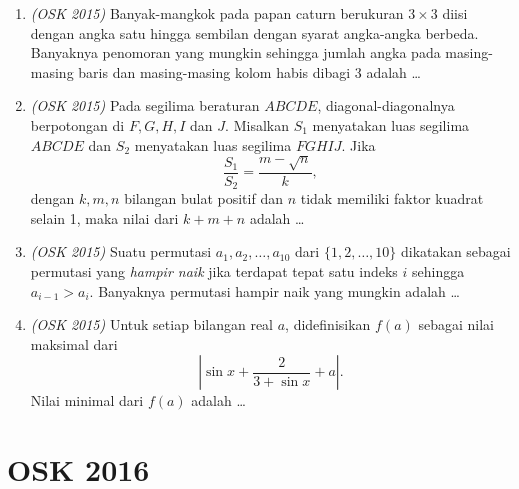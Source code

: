\documentclass[11pt]{scrartcl}
\begin{document}
\begin{enumerate}
\item \textit{(OSK 2015)} Banyak-mangkok pada papan caturn berukuran $3\times 3$ diisi dengan angka satu hingga sembilan dengan syarat angka-angka berbeda. Banyaknya penomoran yang mungkin sehingga jumlah angka pada masing-masing baris dan masing-masing kolom habis dibagi 3 adalah \dots

\item \textit{(OSK 2015)} Pada segilima beraturan $ABCDE$, diagonal-diagonalnya berpotongan di $F,G,H,I$ dan $J$. Misalkan $S_1$ menyatakan luas segilima $ABCDE$ dan $S_2$ menyatakan luas segilima $FGHIJ$. Jika
\[
\frac{S_1}{S_2} = \frac{m - \sqrt{n}}{k},
\]
dengan $k,m,n$ bilangan bulat positif dan $n$ tidak memiliki faktor kuadrat selain 1, maka nilai dari $k + m + n$ adalah \dots

\item \textit{(OSK 2015)} Suatu permutasi $a_1,a_2,\ldots,a_{10}$ dari $\{1,2,\ldots,10\}$ dikatakan sebagai permutasi yang \emph{hampir naik} jika terdapat tepat satu indeks $i$ sehingga $a_{i-1}>a_i$. Banyaknya permutasi hampir naik yang mungkin adalah \dots

\item \textit{(OSK 2015)} Untuk setiap bilangan real $a$, didefinisikan $f(a)$ sebagai nilai maksimal dari
\[
\left|\sin x + \frac{2}{3+\sin x} + a\right|.
\]
Nilai minimal dari $f(a)$ adalah \dots

\end{enumerate}


\newpage
\section{OSK 2016}
\end{document}
